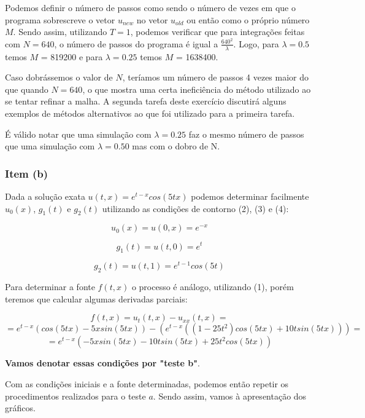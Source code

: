 \documentclass[a4paper, 12pt]{article}
\begin{document}
Podemos definir o número de passos como sendo o número de vezes em que o programa sobrescreve o vetor $u_{new}$ no vetor $u_{old}$ ou então como o próprio número $M$. Sendo assim, utilizando $T=1$, podemos verificar que para integrações feitas com $N=640$, o número de passos do programa é igual a $\frac{640^2}{\lambda}$. Logo, para $\lambda = 0.5$ temos $M$ = 819200 e para $\lambda = 0.25$ temos $M$ = 1638400. 

Caso dobrássemos o valor de $N$, teríamos um número de passos 4 vezes maior do que quando $N=640$, o que mostra uma certa ineficiência do método utilizado ao se tentar refinar a malha. A segunda tarefa deste exercício discutirá alguns exemplos de métodos alternativos ao que foi utilizado para a primeira tarefa. 

É válido notar que uma simulação com $\lambda = 0.25$ faz o mesmo número de passos que uma simulação com $\lambda = 0.50$ mas com o dobro de N.

\subsubsection{Item (b)}

Dada a solução exata $u(t,x)=e^{t-x}cos(5tx)$ podemos determinar facilmente $u_0(x)$, $g_1(t)$ e $g_2(t)$ utilizando as condições de contorno (2), (3) e (4):

$$u_0(x)=u(0,x)=e^{-x}$$

$$g_1(t)=u(t,0)=e^{t}$$

$$g_2(t)=u(t,1)=e^{t-1}cos(5t)$$

Para determinar a fonte $f(t,x)$ o processo é análogo, utilizando (1), porém teremos que calcular algumas derivadas parciais:

$$f(t,x)=u_t(t,x)-u_{xx}(t,x)=$$ $$=e^{t-x}(cos(5tx)-5xsin(5tx))-(e^{t-x}((1-25t^2)cos(5tx)+10tsin(5tx)))=$$
$$=e^{t-x}(-5xsin(5tx)-10tsin(5tx)+25t^{2}cos(5tx))$$

\textbf{Vamos denotar essas condições por "teste b"}.

Com as condições iniciais e a fonte determinadas, podemos então repetir os procedimentos realizados para o teste $a$. Sendo assim, vamos à apresentação dos gráficos.
\end{document}
